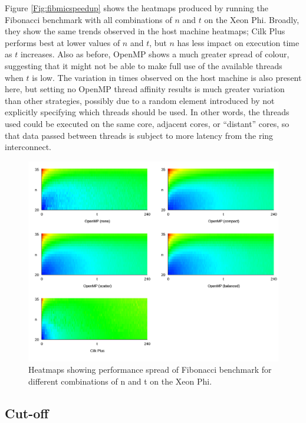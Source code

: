 \documentclass{report}
\begin{document}
Figure \ref{Fig:fibmicspeedup} shows the heatmaps produced by running the Fibonacci benchmark with all combinations of \(n\) and \(t\) on the Xeon Phi. Broadly, they show the same trends observed in the host machine heatmaps; Cilk Plus performs best at lower values of \(n\) and \(t\), but \(n\) has less impact on execution time as \(t\) increases. Also as before, OpenMP shows a much greater spread of colour, suggesting that it might not be able to make full use of the available threads when \(t\) is low. The variation in times observed on the host machine is also present here, but setting no OpenMP thread affinity results is much greater variation than other strategies, possibly due to a random element introduced by not explicitly specifying which threads should be used. In other words, the threads used could be executed on the same core, adjacent cores, or ``distant'' cores, so that data passed between threads is subject to more latency from the ring interconnect.
\noindent
\begin{figure}[t!]
	\includegraphics[width=\linewidth]{../../heatmaps/mic/fib}
	\caption{Heatmaps showing performance spread of Fibonacci benchmark for different combinations of n and t on the Xeon Phi.}
	\label{Fig:fibmicheatmap}
\end{figure}

\subsection{Cut-off} \label{Sec:evalfibcutoff}
\end{document}
